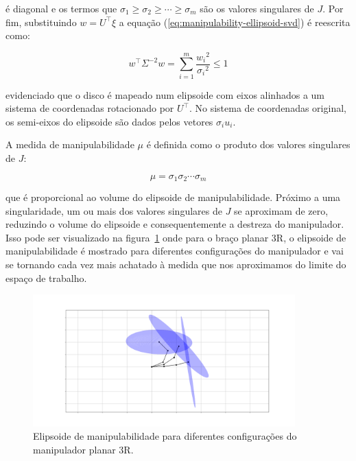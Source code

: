é diagonal e os termos que \(\sigma_1 \geq \sigma_2 \geq \cdots \geq \sigma_m\) são os valores
singulares de \(J\). Por fim, substituindo \(w = U^\top \xi\) a equação
(\ref{eq:manipulability-ellipsoid-svd}) é reescrita como:

\begin{equation}
    w^\top \Sigma^{-2} w = \sum_{i=1}^m{\frac{{w_i}^2}{{\sigma_i}^2}} \leq 1
\end{equation}

evidenciado que o disco é mapeado num elipsoide com eixos alinhados a um
sistema de coordenadas rotacionado por \(U^\top\). No sistema de coordenadas
original, os semi-eixos do elipsoide são dados pelos vetores \(\sigma_i u_i\).

A medida de manipulabilidade \(\mu\) é definida como o produto dos valores
singulares de \(J\):

\begin{equation}\label{eq:manipulability}
    \mu = \sigma_1 \sigma_2 \cdots \sigma_m
\end{equation}

que é proporcional ao volume do elipsoide de manipulabilidade. Próximo a 
uma singularidade, um ou mais dos valores singulares de \(J\) se
aproximam de zero, reduzindo o volume do elipsoide e consequentemente a
destreza do manipulador. Isso pode ser visualizado na
figura~\ref{fig:manipulability-ellipsoid} onde para o braço planar 3R, o
elipsoide de manipulabilidade é mostrado para diferentes configurações do
manipulador e vai se tornando cada vez mais achatado à medida que nos
aproximamos do limite do espaço de trabalho.

\begin{figure}
    \centering
    \includegraphics[width=0.9\textwidth]{Images/3r-ellipsoid.png}
    \caption{Elipsoide de manipulabilidade para diferentes configurações do manipulador planar 3R.}\label{fig:manipulability-ellipsoid}
\end{figure}

